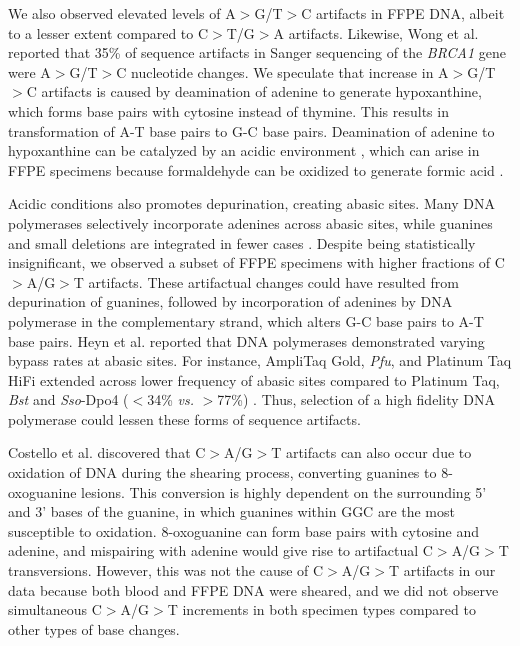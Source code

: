 We also observed elevated levels of A$>$G/T$>$C artifacts in FFPE DNA, albeit to a lesser extent compared to C$>$T/G$>$A artifacts. Likewise, Wong et al. \cite{Wong1998} reported that 35\% of sequence artifacts in Sanger sequencing of the \textit{BRCA1} gene were A$>$G/T$>$C nucleotide changes. We speculate that increase in A$>$G/T$>$C artifacts is caused by deamination of adenine to generate hypoxanthine, which forms base pairs with cytosine instead of thymine. This results in transformation of A-T base pairs to G-C base pairs. Deamination of adenine to hypoxanthine can be catalyzed by an acidic environment \cite{Wang2010}, which can arise in FFPE specimens because formaldehyde can be oxidized to generate formic acid \cite{Do2015a}.

Acidic conditions also promotes depurination, creating abasic sites. Many DNA polymerases selectively incorporate adenines across abasic sites, while guanines and small deletions are integrated in fewer cases \cite{Heyn2010}. Despite being statistically insignificant, we observed a subset of FFPE specimens with higher fractions of C$>$A/G$>$T artifacts. These artifactual changes could have resulted from depurination of guanines, followed by incorporation of adenines by DNA polymerase in the complementary strand, which alters G-C base pairs to A-T base pairs. Heyn et al. \cite{Heyn2010} reported that DNA polymerases demonstrated varying bypass rates at abasic sites. For instance, AmpliTaq Gold, \textit{Pfu}, and Platinum Taq HiFi extended across lower frequency of abasic sites compared to Platinum Taq, \textit{Bst} and \textit{Sso}-Dpo4 ($<$34\% \textit{vs.} $>$77\%) \cite{Heyn2010}. Thus, selection of a high fidelity DNA polymerase could lessen these forms of sequence artifacts.

Costello et al. \cite{Costello2013} discovered that C$>$A/G$>$T artifacts can also occur due to oxidation of DNA during the shearing process, converting guanines to 8-oxoguanine lesions. This conversion is highly dependent on the surrounding 5' and 3' bases of the guanine, in which guanines within GGC are the most susceptible to oxidation. 8-oxoguanine can form base pairs with cytosine and adenine, and mispairing with adenine would give rise to artifactual C$>$A/G$>$T transversions. However, this was not the cause of C$>$A/G$>$T artifacts in our data because both blood and FFPE DNA were sheared, and we did not observe simultaneous C$>$A/G$>$T increments in both specimen types compared to other types of base changes.

